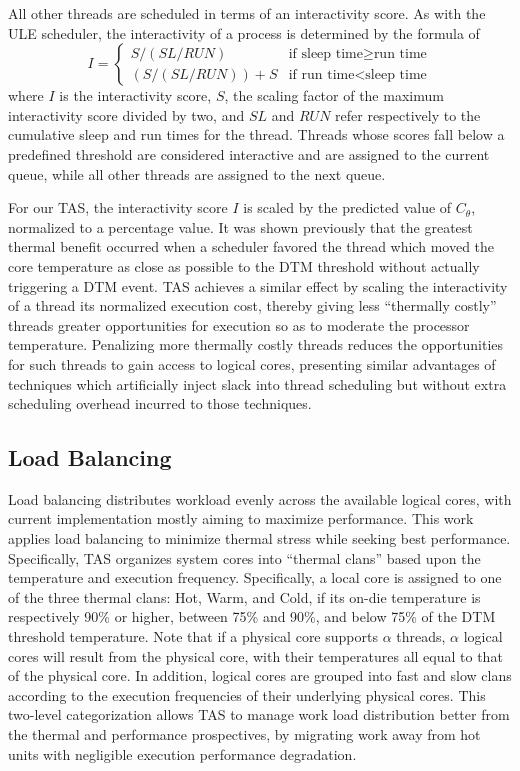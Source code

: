 \documentclass[times, 10pt,twocolumn]{IEEEtran}
\begin{document}
All other threads are scheduled in terms of an interactivity score.  As
with the ULE scheduler, the interactivity of a process is
determined by the formula of
\begin{equation}
\label{eq:interactsleeprun} 
I =   
\begin{cases}
  S / (SL/RUN) & \text{if sleep time} \geq \text{run time}\\
  (S/ (SL / RUN))+S & \text{if run time} < \text{sleep time}
\end{cases}
\end{equation}
where $I$ is the interactivity score, $S$, the scaling factor of the
maximum interactivity score divided by two, and $SL$ and $RUN$ refer
respectively to the cumulative sleep and run times for the thread.   
Threads whose scores fall below a predefined threshold are considered
interactive and are assigned to the current queue, while all other
threads are assigned to the next queue.

For our TAS, the interactivity score $I$ is scaled by the predicted
value of $C_{\theta}$, normalized to a percentage value.  It was shown
previously \cite{Zhou2010b} that the greatest thermal benefit occurred
when a scheduler favored the thread which moved the core temperature as
close as possible to the DTM threshold without actually triggering a DTM
event.  TAS achieves a similar effect by scaling the interactivity of a
thread its normalized execution cost, thereby giving less ``thermally
costly'' threads greater opportunities for execution so as to moderate
the processor temperature.  Penalizing more thermally costly threads
reduces the opportunities for such threads to gain access to logical
cores, presenting similar advantages of techniques which artificially
inject slack into thread scheduling but without extra scheduling
overhead incurred to those techniques.

\subsection{Load Balancing}
\label{sec:loadbalance} 
Load balancing distributes workload evenly across the available logical
cores, with current implementation mostly aiming to maximize
performance.  This work applies load balancing to minimize thermal
stress while seeking best performance.  Specifically, TAS organizes
system cores into ``thermal clans'' based upon the temperature and
execution frequency.  Specifically, a local core is assigned to one of
the three thermal clans: Hot, Warm, and Cold, if its on-die temperature
is respectively 90\% or higher, between 75\% and 90\%, and below 75\% of
the DTM threshold temperature.  Note that if a physical core supports
$\alpha$ threads, $\alpha$ logical cores will result from the physical
core, with their temperatures all equal to that of the physical core.
In addition, logical cores are grouped into fast and slow clans
according to the execution frequencies of their underlying physical
cores.  This two-level categorization allows TAS to manage work load
distribution better from the thermal and performance prospectives, by
migrating work away from hot units with negligible execution performance
degradation.
\end{document}
